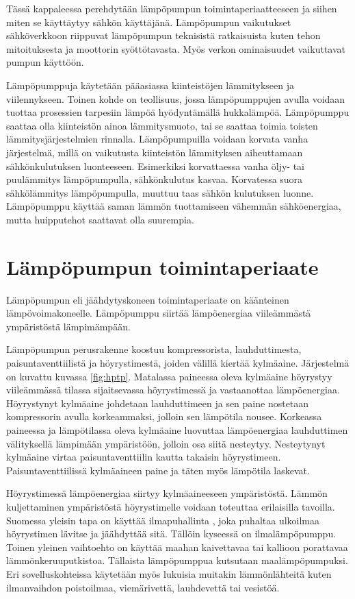 Tässä kappaleessa perehdytään lämpöpumpun toimintaperiaatteeseen ja siihen miten se käyttäytyy sähkön käyttäjänä. Lämpöpumpun vaikutukset sähköverkkoon riippuvat lämpöpumpun teknisistä ratkaisuista kuten tehon mitoituksesta ja moottorin syöttötavasta. Myös verkon ominaisuudet vaikuttavat pumpun käyttöön.

Lämpöpumppuja käytetään pääasiassa kiinteistöjen lämmitykseen ja viilennykseen. Toinen kohde on teollisuus, jossa lämpöpumppujen avulla voidaan tuottaa prosessien tarpesiin lämpöä hyödyntämällä hukkalämpöä\parencite{Setala}. Lämpöpumppu saattaa olla kiinteistön ainoa lämmitysmuoto, tai se saattaa toimia toisten lämmitysjärjestelmien rinnalla. Lämpöpumpuilla voidaan korvata vanha järjestelmä, millä on vaikutusta kiinteistön lämmityksen aiheuttamaan sähkönkulutuksen luonteeseen. Esimerkiksi korvattaessa vanha öljy- tai puulämmitys lämpöpumpulla, sähkönkulutus kasvaa. Korvatessa suora sähkölämmitys lämpöpumpulla, muuttuu taas sähkön kulutuksen luonne. Lämpöpumppu käyttää saman lämmön tuottamiseen vähemmän sähköenergiaa, mutta huipputehot saattavat olla suurempia.

\section{Lämpöpumpun toimintaperiaate}
  Lämpöpumpun eli jäähdytyskoneen toimintaperiaate on käänteinen lämpövoimakoneelle. Lämpöpumppu siirtää lämpöenergiaa viileämmästä ympäristöstä lämpimämpään.\parencite{DincerRosen}

  Lämpöpumpun perusrakenne koostuu kompressorista, lauhduttimesta, paisuntaventtiilistä ja höyrystimestä, joiden välillä kiertää kylmäaine. Järjestelmä on kuvattu kuvassa \ref{fig:hptp}. Matalassa paineessa oleva kylmäaine höyrystyy viileämmässä tilassa sijaitsevassa höyrystimessä ja vastaanottaa lämpöenergiaa. Höyrystynyt kylmäaine johdetaan lauhduttimeen ja sen paine nostetaan kompressorin avulla korkeammaksi, jolloin sen lämpötila nousee. Korkeassa paineessa ja lämpötilassa oleva kylmäaine luovuttaa lämpöenergiaa lauhduttimen välityksellä lämpimään ympäristöön, jolloin osa siitä nesteytyy. Nesteytynyt kylmäaine virtaa paisuntaventtiilin kautta takaisin höyrystimeen. Paisuntaventtiilissä kylmäaineen paine ja täten myös lämpötila laskevat.\parencite{DincerRosen}

  Höyrystimessä lämpöenergiaa siirtyy kylmäaineeseen ympäristöstä. Lämmön kuljettaminen ympäristöstä höyrystimelle voidaan toteuttaa erilaisilla tavoilla. Suomessa yleisin tapa on käyttää ilmapuhallinta , joka puhaltaa ulkoilmaa höyrystimen lävitse ja jäähdyttää sitä. Tällöin kyseessä on ilmalämpöpumppu. Toinen yleinen vaihtoehto on käyttää maahan kaivettavaa tai kallioon porattavaa lämmönkeruuputkistoa. Tällaista lämpöpumppua kutsutaan maalämpöpumpuksi. Eri sovelluskohteissa käytetään myös lukuisia muitakin lämmönlähteitä kuten ilmanvaihdon poistoilmaa, viemärivettä, lauhdevettä tai vesistöä.\parencite{DincerRosen}

